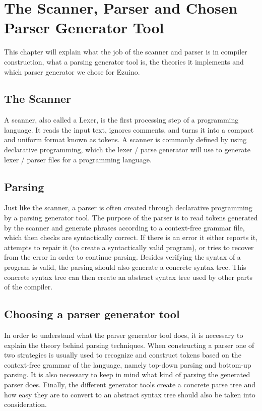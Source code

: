 \section{The Scanner, Parser and Chosen Parser Generator Tool}
This chapter will explain what the job of the scanner and parser is in compiler construction, what a parsing generator tool is, the theories it implements and which parser generator we chose for Ezuino.

\subsection{The Scanner}
A scanner, also called a Lexer, is the first processing step of a programming language. It reads the input text, ignores comments, and turns it into a compact and uniform format known as tokens.
A scanner is commonly defined by using declarative programming, which the lexer / parse generator will use to generate lexer / parser files for a programming language. 
\cite{fischer2011crafting}
\label{parsing-subsubsection}
\subsection{Parsing}
Just like the scanner, a parser is often created through declarative programming by a parsing generator tool. The purpose of the parser is to read tokens generated by the scanner and generate phrases according to a context-free grammar file, which then checks are syntactically correct. If there is an error it either reports it, attempts to repair it (to create a syntactically valid program), or tries to recover from the error in order to continue parsing. Besides verifying the syntax of a program is valid, the parsing should also generate a concrete syntax tree. This concrete syntax tree can then create an abstract syntax tree used by other parts of the compiler.

\subsection{Choosing a parser generator tool}
In order to understand what the parser generator tool does, it is necessary to explain the theory behind parsing techniques. When constructing a parser one of two strategies is usually used to recognize and construct tokens based on the context-free grammar of the language, namely top-down parsing and bottom-up parsing. It is also necessary to keep in mind what kind of parsing the generated parser does. Finally, the different generator tools create a concrete parse tree and how easy they are to convert to an abstract syntax tree should also be taken into consideration.
